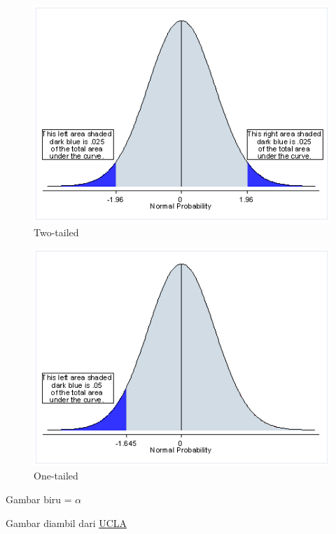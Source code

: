 \documentclass[
  letterpaper,
  DIV=11,
  numbers=noendperiod]{scrartcl}
\begin{document}
\begin{figure}

{\centering \includegraphics{pvalue1.gif}

}

\caption{Two-tailed}

\end{figure}

\begin{figure}

{\centering \includegraphics{pvalue2.gif}

}

\caption{One-tailed}

\end{figure}

Gambar biru = \(\alpha\)

Gambar diambil dari
\href{https://stats.oarc.ucla.edu/other/mult-pkg/faq/general/faq-what-are-the-differences-between-one-tailed-and-two-tailed-tests/}{UCLA}
\end{document}
